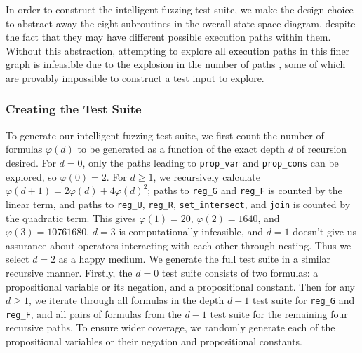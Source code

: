 \documentclass[runningheads]{llncs}
\renewcommand{\phi}{\varphi}
\begin{document}
In order to construct the intelligent fuzzing test suite, we make the design choice to abstract away the eight subroutines in the overall state space diagram, despite the fact that they may have different possible execution paths within them. Without this abstraction, attempting to explore all execution paths in this finer graph is infeasible due to the explosion in the number of paths \cite{Pham_2016}, some of which are provably impossible to construct a test input to explore.
\subsubsection{Creating the Test Suite} %
To generate our intelligent fuzzing test suite, we first count the number of formulas $\phi(d)$ to be generated as a function of the exact depth $d$ of recursion desired. 
For $d = 0$, only the paths leading to \texttt{prop\_var} and \texttt{prop\_cons} can be explored, so $\phi(0) = 2$. For $d \geq 1$, we recursively calculate $\phi(d + 1) = 2\phi(d) + 4\phi(d)^2$; paths to \texttt{reg\_G} and \texttt{reg\_F} is counted by the linear term, and paths to \texttt{reg\_U}, \texttt{reg\_R}, \texttt{set\_intersect}, and \texttt{join} is counted by the quadratic term. 
This gives $\phi(1) = 20$, $\phi(2) = 1640$, and $\phi(3) = 10761680$. 
$d = 3$ is computationally infeasible, and $d = 1$ doesn't give us assurance about operators interacting with each other through nesting. Thus we select $d = 2$ as a happy medium. 
We generate the full test suite in a similar recursive manner. 
Firstly, the $d = 0$ test suite consists of two formulas: a propositional variable or its negation, and a propositional constant. 
Then for any $d \geq 1$, we iterate through all formulas in the depth $d-1$ test suite for \texttt{reg\_G} and \texttt{reg\_F}, and all pairs of formulas from the $d-1$ test suite for the remaining four recursive paths. 
To ensure wider coverage, we randomly generate each of the propositional variables or their negation and propositional constants.
\end{document}
